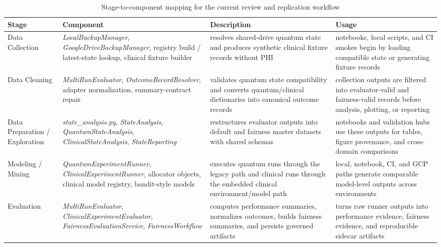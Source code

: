 \documentclass{IEEEtran}
\begin{document}
\begin{table}[!t]
\centering
\caption{Stage-to-component mapping for the current review and replication workflow}
\label{tab:stage_objects}
\small
\begin{tabularx}{\textwidth}{>{\raggedright\arraybackslash}p{2.7cm} >{\raggedright\arraybackslash}p{4.7cm} >{\raggedright\arraybackslash}p{4.3cm} >{\raggedright\arraybackslash}p{5.0cm}}
\toprule
\rowcolor{gray!15}
\textbf{Stage} & \textbf{Component} & \textbf{Description} & \textbf{Usage} \\
\midrule

\rowcolor{phase1blue!12}
Data Collection & \textit{LocalBackupManager}, \textit{GoogleDriveBackupManager}, registry build / latest-state lookup, clinical fixture builder & resolves shared-drive quantum state and produces synthetic clinical fixture records without PHI & notebooks, local scripts, and CI smokes begin by loading compatible state or generating fixture records \\
\midrule

\rowcolor{phase1blue!12}
Data Cleaning & \textit{MultiRunEvaluator}, \textit{OutcomeRecordResolver}, adapter normalization, summary-contract repair & validates quantum state compatibility and converts quantum/clinical dictionaries into canonical outcome records & collection outputs are filtered into evaluator-valid and fairness-valid records before analysis, plotting, or reporting \\
\midrule

\rowcolor{phase2green!12}
Data Preparation / Exploration & \textit{state\_analysis.py}, \textit{StateAnalysis}, \textit{QuantumStateAnalysis}, \textit{ClinicalStateAnalysis}, \textit{StateReporting} & restructures evaluator outputs into default and fairness master datasets with shared schemas & notebooks and validation hubs use these outputs for tables, figure provenance, and cross-domain comparisons \\
\midrule

\rowcolor{phase3orange!12}
Modeling / Mining & \textit{QuantumExperimentRunner}, \textit{ClinicalExperimentRunner}, allocator objects, clinical model registry, bandit-style models & executes quantum runs through the legacy path and clinical runs through the embedded clinical environment/model path & local, notebook, CI, and GCP paths generate comparable model-level outputs across environments \\
\midrule

\rowcolor{phase3orange!12}
Evaluation & \textit{MultiRunEvaluator}, \textit{ClinicalExperimentEvaluator}, \textit{FairnessEvaluationService}, \textit{FairnessWorkflow} & computes performance summaries, normalizes outcomes, builds fairness summaries, and persists governed artifacts & turns raw runner outputs into performance evidence, fairness evidence, and reproducible sidecar artifacts \\
\midrule


\end{tabularx}
\end{table}
\end{document}
